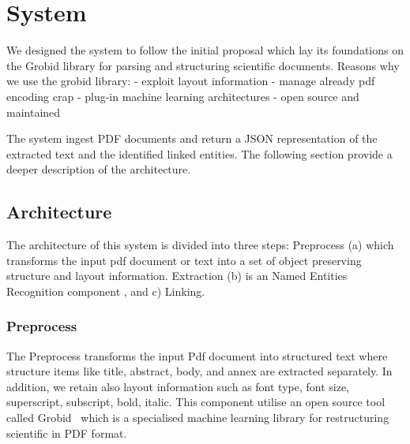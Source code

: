 \documentclass{article}
\begin{document}



\section{System}

We designed the system to follow the initial proposal \cite{foppiano:hal-02870896} which lay its foundations on the Grobid library for parsing and structuring scientific documents.
Reasons why we use the grobid library: 
 - exploit layout information
 - manage already pdf encoding crap 
 - plug-in machine learning architectures 
 - open source and maintained 
 
The system ingest PDF documents and return a JSON representation of the extracted text and the identified linked entities. 
The following section provide a deeper description of the architecture. 

\subsection{Architecture}

The architecture of this system is divided into three steps: Preprocess (a) which transforms the input pdf document or text into a set of object preserving structure and layout information. Extraction (b) is an Named Entities Recognition component , and c) Linking.


\subsubsection{Preprocess}
The Preprocess transforms the input Pdf document into structured text where structure items like title, abstract, body, and annex are extracted separately. In addition, we retain also layout information such as font type, font size, superscript, subscript, bold, italic. 
This component utilise an open source tool called Grobid~\cite{GROBID} which is a specialised machine learning library for restructuring scientific in PDF format. 
\end{document}
